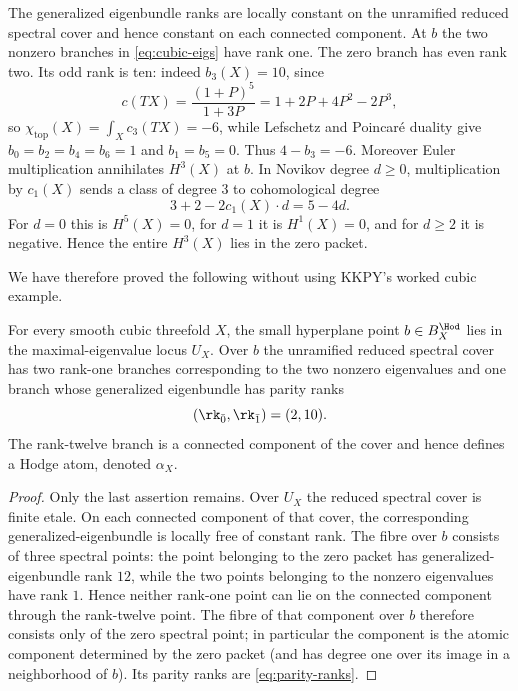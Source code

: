 The generalized eigenbundle ranks are locally constant on the unramified
reduced spectral cover and hence constant on each connected component.  At
$b$ the two nonzero branches in \eqref{eq:cubic-eigs} have rank one.  The
zero branch has even rank two.  Its odd rank is ten: indeed
$b_3(X)=10$, since
\[
  c(TX)=\frac{(1+P)^5}{1+3P}=1+2P+4P^2-2P^3,
\]
so $\chi_{\mathrm{top}}(X)=\int_Xc_3(TX)=-6$, while Lefschetz and Poincar\'e
duality give
$b_0=b_2=b_4=b_6=1$ and $b_1=b_5=0$.  Thus $4-b_3=-6$.
Moreover Euler multiplication annihilates $H^3(X)$ at $b$.  In Novikov
degree $d\ge0$, multiplication by $c_1(X)$ sends a class of degree $3$ to
cohomological degree
\[
  3+2-2c_1(X)\cdot d=5-4d.
\]
For $d=0$ this is $H^5(X)=0$, for $d=1$ it is $H^1(X)=0$, and for $d\ge2$
it is negative.  Hence the entire $H^3(X)$ lies in the zero packet.

We have therefore proved the following without using KKPY's worked cubic
example.

\begin{proposition}\label{prop:cubic-atom}
%
%
%
For every smooth cubic threefold $X$, the small hyperplane point
$b\in B_X^{\Hod}$ lies in the maximal-eigenvalue locus $U_X$.  Over $b$ the
unramified reduced spectral cover has two rank-one branches corresponding to
the two nonzero eigenvalues and one branch whose generalized eigenbundle has
parity ranks
\begin{equation}\label{eq:parity-ranks}
  (\rk_{\bar0},\rk_{\bar1})=(2,10).
\end{equation}
The rank-twelve branch is a connected component of the cover and hence
defines a Hodge atom, denoted $\alpha_X$.
\end{proposition}

\begin{proof}
Only the last assertion remains.  Over $U_X$ the reduced spectral cover is
finite etale.  On each connected component of that cover, the corresponding
generalized-eigenbundle is locally free of constant rank.  The fibre over
$b$ consists of three spectral points: the point belonging to the zero packet
has generalized-eigenbundle rank $12$, while the two points belonging to the
nonzero eigenvalues have rank $1$.  Hence neither rank-one point can lie on
the connected component through the rank-twelve point.  The fibre of that
component over $b$ therefore consists only of the zero spectral point; in
particular the component is the atomic component determined by the zero
packet (and has degree one over its image in a neighborhood of $b$).  Its
parity ranks are \eqref{eq:parity-ranks}.
%
\end{proof}

